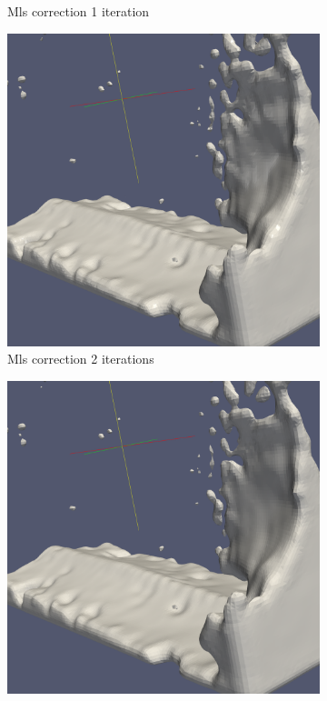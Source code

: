 \begin{figure}
\begin{center}
\begin{subfigure}[b]{0.47\textwidth}
			\caption{Mls correction 1 iteration}
		\end{subfigure}
		\begin{subfigure}[b]{0.47\textwidth}
			\includegraphics[width=\textwidth]{figures/MlsSurface2Iteration.png}
			\caption{Mls correction 2 iterations}
		\end{subfigure}
		\begin{subfigure}[b]{0.47\textwidth}
			\includegraphics[width=\textwidth]{figures/MlsSurface3Iteration.png}

\end{subfigure}
\end{center}
\end{figure}
